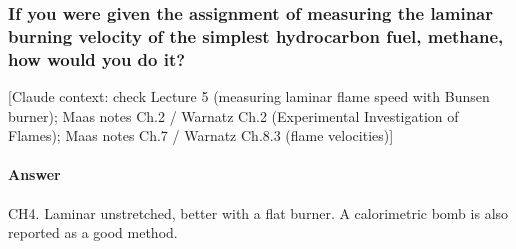 \subsubsection{If you were given the assignment of measuring the laminar burning velocity of the simplest hydrocarbon fuel, methane, how would you do it?}

{\color{gray}\footnotesize [Claude context: check Lecture 5 (measuring laminar flame speed with Bunsen burner); Maas notes Ch.2 / Warnatz Ch.2 (Experimental Investigation of Flames); Maas notes Ch.7 / Warnatz Ch.8.3 (flame velocities)]}

\paragraph{Answer} CH4. Laminar unstretched, better with a flat burner. A calorimetric bomb is also reported as a good method.


